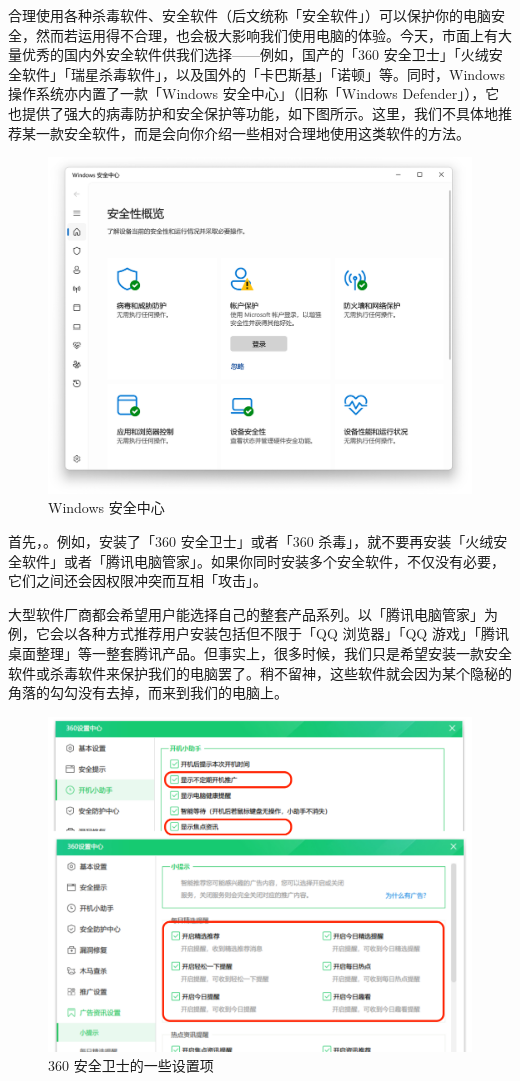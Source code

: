 合理使用各种杀毒软件、安全软件（后文统称「安全软件」）可以保护你的电脑安全，然而若运用得不合理，也会极大影响我们使用电脑的体验。今天，市面上有大量优秀的国内外安全软件供我们选择——例如，国产的「360 安全卫士」「火绒安全软件」「瑞星杀毒软件」，以及国外的「卡巴斯基」「诺顿」等。同时，Windows 操作系统亦内置了一款「Windows 安全中心」（旧称「Windows Defender」），它也提供了强大的病毒防护和安全保护等功能，如下图所示。这里，我们不具体地推荐某一款安全软件，而是会向你介绍一些相对合理地使用这类软件的方法。

\begin{figure}[htb!]
  \centering
  \includegraphics[width=.64\textwidth]{assets/basic/Windows_Security.png}
  \caption{Windows 安全中心}
  \label{fig:Windows_Security}
\end{figure}

首先，。例如，安装了「360 安全卫士」或者「360 杀毒」，就不要再安装「火绒安全软件」或者「腾讯电脑管家」。如果你同时安装多个安全软件，不仅没有必要，它们之间还会因权限冲突而互相「攻击」。

大型软件厂商都会希望用户能选择自己的整套产品系列。以「腾讯电脑管家」为例，它会以各种方式推荐用户安装包括但不限于「QQ 浏览器」「QQ 游戏」「腾讯桌面整理」等一整套腾讯产品。但事实上，很多时候，我们只是希望安装一款安全软件或杀毒软件来保护我们的电脑罢了。稍不留神，这些软件就会因为某个隐秘的角落的勾勾没有去掉，而来到我们的电脑上。

\begin{figure}[htb!]
  \centering
  \includegraphics[width=.64\textwidth]{assets/basic/Disable_360_ads.png}
  \caption{360 安全卫士的一些设置项}
  \label{fig:Disable_360_ads}
\end{figure}

